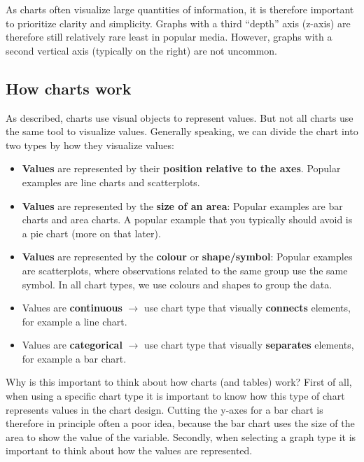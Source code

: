 \documentclass[
]{book}
\begin{document}
As charts often visualize large quantities of information, it is therefore important to prioritize clarity and simplicity. Graphs with a third ``depth'' axis (z-axis) are therefore still relatively rare least in popular media. However, graphs with a second vertical axis (typically on the right) are not uncommon.

\hypertarget{how-charts-work}{%
\subsection*{How charts work}\label{how-charts-work}}

As described, charts use visual objects to represent values. But not all charts use the same tool to visualize values. Generally speaking, we can divide the chart into two types by how they visualize values:

\begin{itemize}
\item
  \textbf{Values} are represented by their \textbf{position relative to the axes}. Popular examples are line charts and scatterplots.
\item
  \textbf{Values} are represented by the \textbf{size of an area}: Popular examples are bar charts and area charts. A popular example that you typically should avoid is a pie chart (more on that later).
\item
  \textbf{Values} are represented by the \textbf{colour} or \textbf{shape/symbol}: Popular examples are scatterplots, where observations related to the same group use the same symbol. In all chart types, we use colours and shapes to group the data.
\item
  Values are \textbf{continuous} \(\rightarrow\) use chart type that visually \textbf{connects} elements, for example a line chart.
\item
  Values are \textbf{categorical} \(\rightarrow\) use chart type that visually \textbf{separates} elements, for example a bar chart.
\end{itemize}

Why is this important to think about how charts (and tables) work? First of all, when using a specific chart type it is important to know how this type of chart represents values in the chart design. Cutting the y-axes for a bar chart is therefore in principle often a poor idea, because the bar chart uses the size of the area to show the value of the variable. Secondly, when selecting a graph type it is important to think about how the values are represented.
\end{document}
